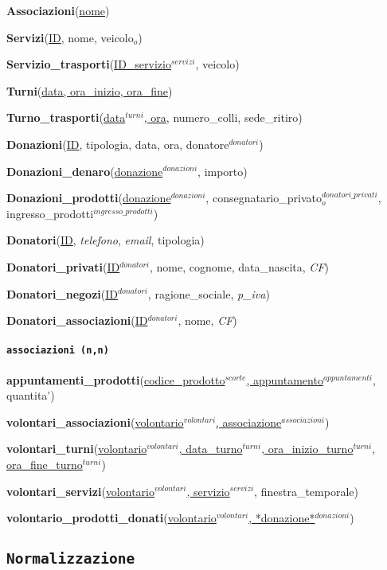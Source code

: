 \documentclass[]{article}
\let\oldparagraph\paragraph
\renewcommand{\paragraph}[1]{\oldparagraph{#1}\mbox{}}
\begin{document}
\textbf{Associazioni}(\underline{nome})

\textbf{Servizi}(\underline{ID}, nome, veicolo\(_o\))

\textbf{Servizio\_trasporti}(\underline{ID\_servizio$^{servizi}$},
veicolo)

\textbf{Turni}(\underline{data, ora\_inizio, ora\_fine})

\textbf{Turno\_trasporti}(\underline{data$^{turni}$, ora},
numero\_colli, sede\_ritiro)

\textbf{Donazioni}(\underline{ID}, tipologia, data, ora,
donatore\(^{donatori}\))

\textbf{Donazioni\_denaro}(\underline{donazione$^{donazioni}$}, importo)

\textbf{Donazioni\_prodotti}(\underline{donazione$^{donazioni}$},
consegnatario\_privato\(^{donatori\_privati}_o\),
ingresso\_prodotti\(^{ingresso\_prodotti}\))

\textbf{Donatori}(\underline{ID}, \emph{telefono}, \emph{email},
tipologia)

\textbf{Donatori\_privati}(\underline{ID$^{donatori}$}, nome, cognome,
data\_nascita, \emph{CF})

\textbf{Donatori\_negozi}(\underline{ID$^{donatori}$}, ragione\_sociale,
\emph{p\_iva})

\textbf{Donatori\_associazioni}(\underline{ID$^{donatori}$}, nome,
\emph{CF})

\hypertarget{associazioni-nn}{%
\paragraph{\texorpdfstring{\texttt{associazioni\ (n,n)}}{associazioni (n,n)}}\label{associazioni-nn}}

\textbf{appuntamenti\_prodotti}(\underline{codice\_prodotto$^{scorte}$, appuntamento$^{appuntamenti}$},
quantita')

\textbf{volontari\_associazioni}(\underline{volontario$^{volontari}$, associazione$^{associazioni}$})

\textbf{volontari\_turni}(\underline{volontario$^{volontari}$, data\_turno$^{turni}$, ora\_inizio\_turno$^{turni}$, ora\_fine\_turno$^{turni}$})

\textbf{volontari\_servizi}(\underline{volontario$^{volontari}$, servizio$^{servizi}$},
finestra\_temporale)

\textbf{volontario\_prodotti\_donati}(\underline{volontario$^{volontari}$, *donazione*$^{donazioni}$})

\hypertarget{normalizzazione}{%
\subsection{\texorpdfstring{\texttt{Normalizzazione}}{Normalizzazione}}\label{normalizzazione}}
\end{document}
